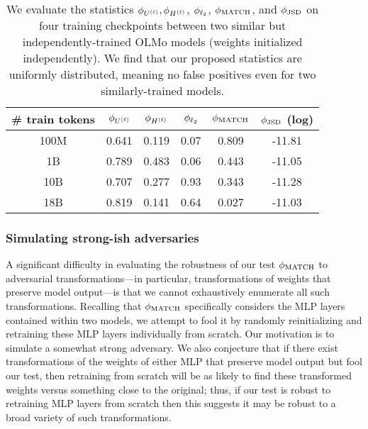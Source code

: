 \begin{table}[]
    \centering
    \begin{tabular}{c|c|c|c|c|c}
    \hline 
        \# train tokens & $\phi_{U^{(\ell)}}$ & $\phi_{H^{(\ell)}}$ & $\phi_{\ell_2}$ & $\phi_{\textup{MATCH}}$ & $\phi_{\textup{JSD}}$ (log) \\ \hline 
        100M & 0.641 & 0.119 & 0.07 & 0.809 & -11.81 \\ 
        1B & 0.789 & 0.483 & 0.06 & 0.443 & -11.05 \\ 
        10B & 0.707 & 0.277 & 0.93 & 0.343 & -11.28 \\ 
        18B & 0.819 & 0.141 & 0.64 & 0.027 & -11.03 \\ \hline 
    \end{tabular}
    \caption{We evaluate the statistics $\phi_{U^{(\ell)}}, \phi_{H^{(\ell)}}$, $\phi_{\ell_2}$, $\phi_{\textup{MATCH}}$, and $\phi_{\textup{JSD}}$ on four training checkpoints between two similar but independently-trained OLMo models (weights initialized independently). We find that our proposed statistics are uniformly distributed, meaning no false positives even for two similarly-trained models.}
    \label{tab:olmo_indp}
\end{table}

\subsubsection{Simulating strong-ish adversaries}
\label{sec:mlp-retrain}

A significant difficulty in evaluating the robustness of our test $\phi_{\textup{MATCH}}$ to adversarial transformations---in particular, transformations of weights that preserve model output---is that we cannot exhaustively enumerate all such transformations.
Recalling that $\phi_{\textup{MATCH}}$ specifically considers the MLP layers contained within two models, we attempt to fool it by randomly reinitializing and retraining these MLP layers individually from scratch.
Our motivation is to simulate a somewhat strong adversary. We also conjecture that if there exist transformations of the weights of either MLP that preserve model output but fool our test, then retraining from scratch will be as likely to find these transformed weights versus something close to the original; thus, if our test is robust to retraining MLP layers from scratch then this suggests it may be robust to a broad variety of such transformations.

